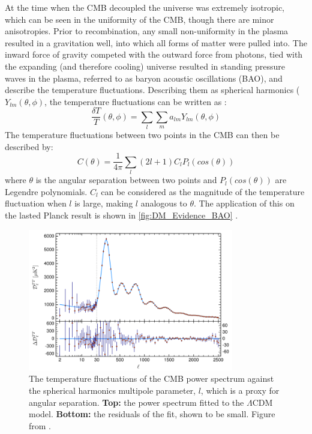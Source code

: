 \par
At the time when the CMB decoupled the universe was extremely isotropic, which can be seen in the uniformity of the CMB, though there are minor anisotropies.
Prior to recombination, any small non-uniformity in the plasma resulted in a gravitation well, into which all forms of matter were pulled into.
The inward force of gravity competed with the outward force from photons, tied with the expanding (and therefore cooling) universe resulted in standing pressure waves in the plasma, referred to as baryon acoustic oscillations (BAO), and describe the temperature fluctuations.
Describing them as spherical harmonics ($Y_{lm}(\theta,\phi)$, the temperature fluctuations can be written as \cite{History_Of_Dark_Matter_2018_ref}:
\begin{equation}
    \frac{\delta T}{T}(\theta, \phi) = \sum_{l} \sum_{m} a_{lm}Y_{lm}(\theta,\phi)
    \label{eq:bao_spherical_harmonics}
\end{equation}
The temperature fluctuations between two points in the CMB can then be described by:
\begin{equation}
    C(\theta) = \frac{1}{4\pi} \sum_{l} (2l + 1) C_l P_l (cos(\theta))
\end{equation}
where $\theta$ is the angular separation between two points and $P_l (cos(\theta))$ are Legendre polynomials.
$C_l$ can be considered as the magnitude of the temperature fluctuation when $l$ is large, making $l$ analogous to $\theta$.
The application of this on the lasted Planck result is shown in \autoref{fig:DM_Evidence_BAO} \cite{plank_result_ref}.
\begin{figure}[!htbp]%
    \centering
    \includegraphics[width=0.8\textwidth]{Figures/DarkMatterEvidence/bao.png}
    \caption[Temperature fluctuations of the CMB spectrum as a function of $l$]{The temperature fluctuations of the CMB power spectrum against the spherical harmonics multipole parameter, $l$, which is a proxy for angular separation.
             \textbf{Top:} the power spectrum fitted to the $\Lambda$CDM model.
             \textbf{Bottom:} the residuals of the fit, shown to be small.
             Figure from \cite{plank_result_ref}.}
    \label{fig:DM_Evidence_BAO}
\end{figure}
